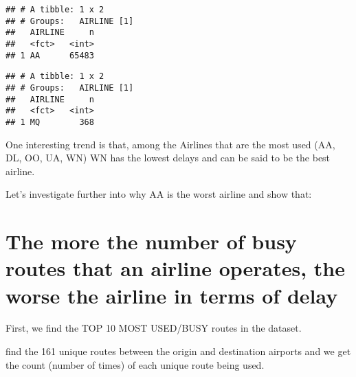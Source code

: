 \documentclass[]{article}
\newenvironment{Shaded}{\begin{snugshade}}{\end{snugshade}}
\newcommand{\KeywordTok}[1]{\textcolor[rgb]{0.13,0.29,0.53}{\textbf{#1}}}
\newcommand{\NormalTok}[1]{#1}
\newcommand{\OperatorTok}[1]{\textcolor[rgb]{0.81,0.36,0.00}{\textbf{#1}}}
\newcommand{\StringTok}[1]{\textcolor[rgb]{0.31,0.60,0.02}{#1}}
\begin{document}
\begin{verbatim}
## # A tibble: 1 x 2
## # Groups:   AIRLINE [1]
##   AIRLINE     n
##   <fct>   <int>
## 1 AA      65483
\end{verbatim}

\begin{Shaded}
\end{Shaded}

\begin{verbatim}
## # A tibble: 1 x 2
## # Groups:   AIRLINE [1]
##   AIRLINE     n
##   <fct>   <int>
## 1 MQ        368
\end{verbatim}

One interesting trend is that, among the Airlines that are the most used
(AA, DL, OO, UA, WN) WN has the lowest delays and can be said to be the
best airline.

Let's investigate further into why AA is the worst airline and show
that:

\hypertarget{the-more-the-number-of-busy-routes-that-an-airline-operates-the-worse-the-airline-in-terms-of-delay}{%
\section{The more the number of busy routes that an airline operates,
the worse the airline in terms of
delay}\label{the-more-the-number-of-busy-routes-that-an-airline-operates-the-worse-the-airline-in-terms-of-delay}}

First, we find the TOP 10 MOST USED/BUSY routes in the dataset.

find the 161 unique routes between the origin and destination airports
and we get the count (number of times) of each unique route being used.

\begin{Shaded}
\end{Shaded}
\end{document}
